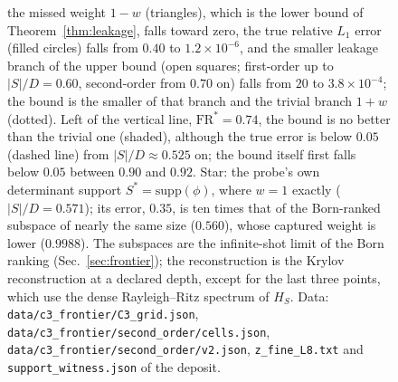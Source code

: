 \begin{figure}[tbp]
{the missed weight $1-w$ (triangles), which is the lower bound of Theorem~\ref{thm:leakage}, falls
toward zero, the true relative $L_1$ error (filled circles) falls from $0.40$ to
$1.2\times10^{-6}$, and the smaller leakage branch of the upper bound (open squares; first-order up to
$\lvert S\rvert/D=0.60$, second-order from $0.70$ on) falls from $20$ to $3.8\times10^{-4}$; the bound
is the smaller of that branch and the trivial branch $1+w$ (dotted). Left of the
vertical line, $\mathrm{FR}^{\ast}=0.74$, the bound is no better than the trivial one (shaded),
although the true error is below $0.05$ (dashed line) from $\lvert S\rvert/D\approx0.525$ on; the
bound itself first falls below $0.05$ between $0.90$ and $0.92$. Star: the probe's own determinant
support $S^\ast=\mathrm{supp}(\phi)$, where $w=1$ exactly ($\lvert S\rvert/D=0.571$); its error,
$0.35$, is ten times that of the Born-ranked subspace of nearly the same size ($0.560$), whose
captured weight is lower ($0.9988$). The subspaces are the infinite-shot limit of the Born ranking
(Sec.~\ref{sec:frontier}); the reconstruction is the Krylov reconstruction at a declared depth, except
for the last three points, which use the dense Rayleigh--Ritz spectrum of $H_S$.
Data: \texttt{data/c3\_frontier/C3\_grid.json}, \texttt{data/c3\_frontier/second\_order/cells.json},
\texttt{data/c3\_frontier/second\_order/v2.json}, \texttt{z\_fine\_L8.txt} and \texttt{support\_witness.json} of the deposit.}\label{fig:results}
\end{figure}
